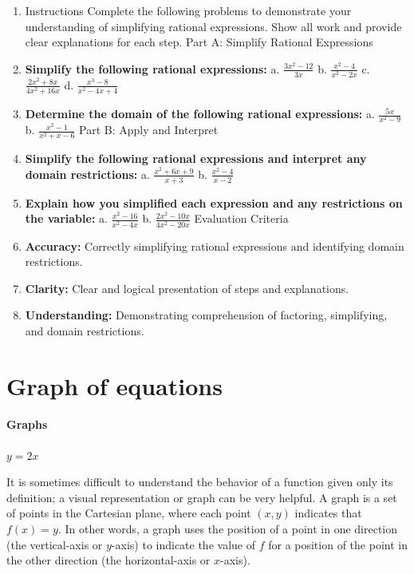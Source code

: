\begin{enumerate}
    \item Instructions Complete the following problems to demonstrate your understanding of simplifying rational expressions. Show all work and provide clear explanations for each step. Part A: Simplify Rational Expressions
    \item \textbf{Simplify the following rational expressions:} a. $ \frac{3x^2 - 12}{3x} $ b. $ \frac{x^2 - 4}{x^2 - 2x} $ c. $ \frac{2x^2 + 8x}{4x^2 + 16x} $ d. $ \frac{x^3 - 8}{x^2 - 4x + 4} $
    \item \textbf{Determine the domain of the following rational expressions:} a. $ \frac{5x}{x^2 - 9} $ b. $ \frac{x^2 - 1}{x^2 + x - 6} $ Part B: Apply and Interpret
    \item \textbf{Simplify the following rational expressions and interpret any domain restrictions:} a. $ \frac{x^2 + 6x + 9}{x + 3} $ b. $ \frac{x^2 - 4}{x - 2} $
    \item \textbf{Explain how you simplified each expression and any restrictions on the variable:} a. $ \frac{x^2 - 16}{x^2 - 4x} $ b. $ \frac{2x^2 - 10x}{4x^2 - 20x} $ Evaluation Criteria
    \item \textbf{Accuracy:} Correctly simplifying rational expressions and identifying domain restrictions.
    \item \textbf{Clarity:} Clear and logical presentation of steps and explanations.
    \item \textbf{Understanding:} Demonstrating comprehension of factoring, simplifying, and domain restrictions.
\end{enumerate}

\section{Graph of equations}
\label{sec:graph-of-equations}

\paragraph{Graphs}

$y = 2x$
 

It is sometimes difficult to understand the behavior of a function given only its definition; a visual representation or graph can be very helpful. A graph is a set of points in the Cartesian plane, where each point $(x, y)$ indicates that $f(x) = y$. In other words, a graph uses the position of a point in one direction (the vertical-axis or $y$-axis) to indicate the value of $f$ for a position of the point in the other direction (the horizontal-axis or $x$-axis).

